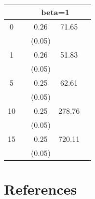 \documentclass[11pt]{article}
\begin{document}
\begin{table}[H]
\begin{tabular}{ccccc}
\hline
      & \multicolumn{4}{c}{ beta=1}  \\
\hline
0      &           & 0.26  & 71.65       &  \\
 &           & (0.05)  &             &  \\
1      &           & 0.26  & 51.83       &  \\
 &           & (0.05)  &             &  \\
5      &           & 0.25  & 62.61       &  \\
 &           & (0.05)  &             &  \\
10     &           & 0.25  & 278.76      &  \\
 &           & (0.05)  &             &  \\
15     &           & 0.25  & 720.11      &  \\
 &           & (0.05)  &             & \\
\bottomrule
\end{tabular}
\end{table}
\clearpage


\section{References}
\begin{doublespacing}   %


\end{doublespacing}
\end{document}
